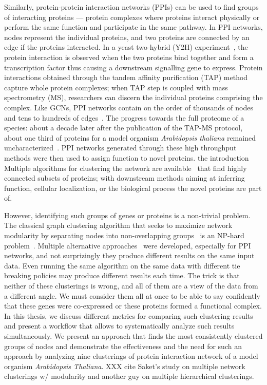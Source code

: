 Similarly, protein-protein interaction networks (PPIs) can be used to find groups of interacting proteins --- protein complexes where proteins interact physically or perform the same function and participate in the same pathway. In PPI networks, nodes represent the individual proteins, and two proteins are connected by an edge if the proteins interacted. In a yeast two-hybrid (Y2H) experiment~\cite{yeast2hybrid}, the protein interaction is observed when the two proteins bind together and form a transcription factor thus causing a downstream signalling gene to express. Protein interactions obtained through the tandem affinity purification (TAP) method capture whole protein complexes; when TAP step is coupled with mass spectrometry (MS), researchers can discern the individual proteins comprising the complex. Like GCNs, PPI networks contain on the order of thousands of nodes and tens to hundreds of edges~\cite{citeAThalsMain,someEcoliOrYeast}. The progress towards the full proteome of a species: about a decade later after the publication of the TAP-MS protocol, about one third of proteins for a model organism \textit{Arabidopsis thaliana} remained uncharacterized~\cite{cite62}. PPI networks generated through these high throughput methods were then used to assign function to novel proteins. the introduction Multiple algorithms for clustering the network are available~\cite{} that find highly connected subsets of proteins; with downstream methods aiming at inferring function, cellular localization, or the biological process the novel proteins are part of. 

However, identifying such groups of genes or proteins is a non-trivial problem. The classical graph clustering algorithm that seeks to maximize network modularity by separating nodes into non-overlapping groups~\cite{modularity} is an NP-hard problem~\cite{modularityNPhard}. Multiple alternative approaches~\cite{PPIclustering} were developed, especially for PPI networks, and not surprizingly they produce different results on the same input data. Even running the same algorithm on the same data with different tie breaking policies may produce different results each time. The trick is that neither of these clusterings is wrong, and all of them are a view of the data from a different angle. We must consider them all at once to be able to say confidently that these genes were co-expressed or these proteins formed a functional complex. In this thesis, we discuss different metrics for comparing such clustering results and present a workflow that allows to systematically analyze such results simultaneously. We present an approach that finds the most consistently clustered groups of nodes and demonstrate the effectiveness and the need for such an approach by analyzing nine clusterings of protein interaction network of a model organism \textit{Arabidopsis Thaliana}. XXX cite Saket's study on multiple network clusterings w/ modularity and another guy on multiple hierarchical clusterings.

